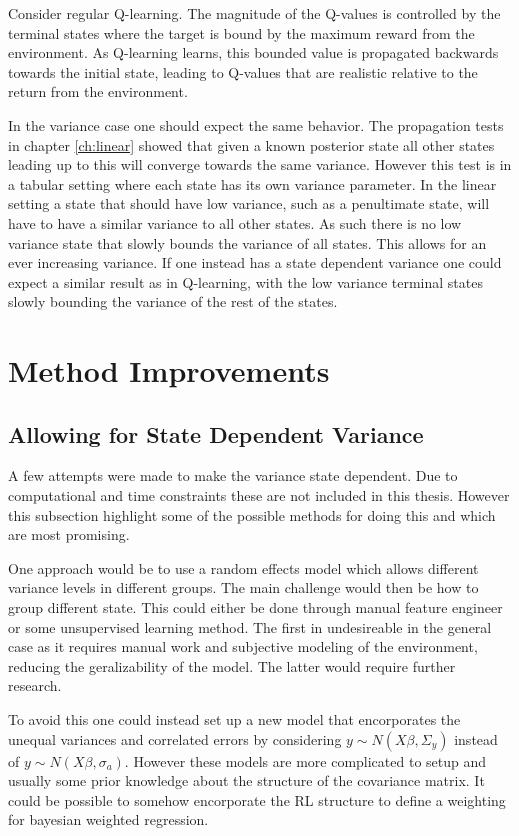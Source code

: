 Consider regular Q-learning. The magnitude of the Q-values is controlled by the terminal states where the target is bound by the maximum reward from the environment. As Q-learning learns, this bounded value is propagated backwards towards the initial state, leading to Q-values that are realistic relative to the return from the environment.

In the variance case one should expect the same behavior. The propagation tests in chapter \ref{ch:linear} showed that given a known posterior state all other states leading up to this will converge towards the same variance. However this test is in a tabular setting where each state has its own variance parameter. In the linear setting a state that should have low variance, such as a penultimate state, will have to have a similar variance to all other states. As such there is no low variance state that slowly bounds the variance of all states. This allows for an ever increasing variance. If one instead has a state dependent variance one could expect a similar result as in Q-learning, with the low variance terminal states slowly bounding the variance of the rest of the states.

\section{Method Improvements}

\subsection{Allowing for State Dependent Variance}

A few attempts were made to make the variance state dependent. Due to computational and time constraints these are not included in this thesis. However this subsection highlight some of the possible methods for doing this and which are most promising.

One approach would be to use a random effects model\citep[p.~382-383]{gelman_2013} which allows different variance levels in different groups. The main challenge would then be how to group different state. This could either be done through manual feature engineer or some unsupervised learning method. The first in undesireable in the general case as it requires manual work and subjective modeling of the environment, reducing the geralizability of the model. The latter would require further research.

To avoid this one could instead set up a new model that encorporates the unequal variances and correlated errors by considering $y \sim N(X\beta, \Sigma_y)$ instead of $y \sim N(X\beta, \sigma_a)$.  However these models are more complicated to setup and usually some prior knowledge about the structure of the covariance matrix. It could be possible to somehow encorporate the RL structure to define a weighting for bayesian weighted regression\citep[p.~370-373]{gelman_2013}. 

